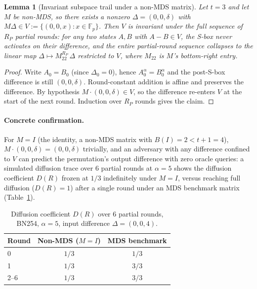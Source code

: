 \documentclass[11pt]{article}
\newtheorem{lemma}{Lemma}
\newcommand{\Fp}{\mathbb{F}_p}
\begin{document}
\begin{lemma}[Invariant subspace trail under a non-MDS matrix]
\label{lem:invariant-subspace}
Let $t=3$ and let $M$ be non-MDS, so there exists a nonzero
$\Delta = (0,0,\delta)$ with $M\Delta \in V := \{(0,0,x) : x \in \Fp\}$.
Then $V$ is invariant under the full sequence of $R_P$ partial rounds:
for any two states $A,B$ with $A-B \in V$, the S-box never activates on
their difference, and the entire partial-round sequence collapses to the
linear map $\Delta \mapsto M_{22}^{R_P}\,\Delta$ restricted to $V$, where
$M_{22}$ is $M$'s bottom-right entry.
\end{lemma}

\begin{proof}
Write $A_0 = B_0$ (since $\Delta_0 = 0$), hence $A_0^{\alpha} = B_0^{\alpha}$
and the post-S-box difference is still $(0,0,\delta)$. Round-constant
addition is affine and preserves the difference. By hypothesis
$M\cdot(0,0,\delta) \in V$, so the difference re-enters $V$ at the start
of the next round. Induction over $R_P$ rounds gives the claim.
\end{proof}

\paragraph{Concrete confirmation.} For $M = I$ (the identity, a non-MDS
matrix with $B(I)=2 < t+1=4$), $M\cdot(0,0,\delta) = (0,0,\delta)$
trivially, and an adversary with any difference confined to $V$ can
predict the permutation's output difference with zero oracle queries: a
simulated diffusion trace over $6$ partial rounds at $\alpha=5$ shows the
diffusion coefficient $D(R)$ frozen at $1/3$ indefinitely under $M=I$,
versus reaching full diffusion ($D(R)=1$) after a single round under an
MDS benchmark matrix (Table~\ref{tab:diffusion}).

\begin{table}[h!]
\centering
\caption{Diffusion coefficient $D(R)$ over $6$ partial rounds, BN254,
$\alpha=5$, input difference $\Delta=(0,0,4)$.}
\label{tab:diffusion}
\begin{tabular}{@{}lcc@{}}
\toprule
Round & Non-MDS ($M=I$) & MDS benchmark \\
\midrule
0 & $1/3$ & $1/3$ \\
1 & $1/3$ & $3/3$ \\
2--6 & $1/3$ & $3/3$ \\
\bottomrule
\end{tabular}
\end{table}
\end{document}
